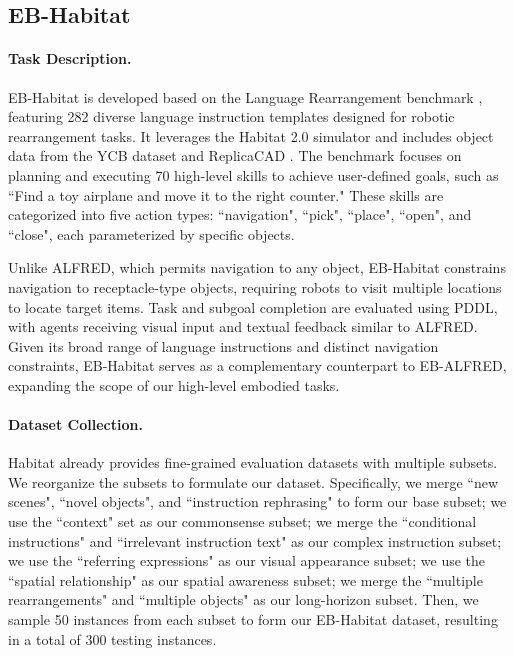 \subsection{EB-Habitat}
\paragraph{Task Description.}EB-Habitat is developed based on the Language Rearrangement benchmark \cite{szot2023large}, featuring 282 diverse language instruction templates designed for robotic rearrangement tasks. It leverages the Habitat 2.0 simulator \cite{szot2021habitat} and includes object data from the YCB dataset \cite{calli2015ycb} and ReplicaCAD \cite{szot2021habitat}. The benchmark focuses on planning and executing 70 high-level skills to achieve user-defined goals, such as ``Find a toy airplane and move it to the right counter." These skills are categorized into five action types: ``navigation", ``pick", ``place", ``open", and ``close", each parameterized by specific objects.


Unlike ALFRED, which permits navigation to any object, EB-Habitat constrains navigation to receptacle-type objects, requiring robots to visit multiple locations to locate target items. Task and subgoal completion are evaluated using PDDL, with agents receiving visual input and textual feedback similar to ALFRED. Given its broad range of language instructions and distinct navigation constraints, EB-Habitat serves as a complementary counterpart to EB-ALFRED, expanding the scope of our high-level embodied tasks.

\paragraph{Dataset Collection.}Habitat already provides fine-grained evaluation datasets with multiple subsets. We reorganize the subsets to formulate our dataset. Specifically, we merge ``new scenes", ``novel objects", and ``instruction rephrasing" to form our base subset; we use the ``context" set as our commonsense subset; we merge the ``conditional instructions" and ``irrelevant instruction text" as our complex instruction subset; we use the ``referring expressions" as our visual appearance subset; we use the ``spatial relationship" as our spatial awareness subset; we merge the ``multiple rearrangements" and ``multiple objects" as our long-horizon subset. Then, we sample 50 instances from each subset to form our EB-Habitat dataset, resulting in a total of 300 testing instances.



